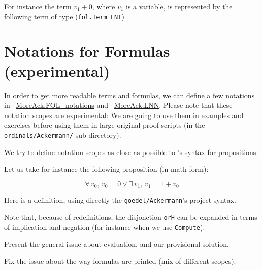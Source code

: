 





For instance the term $v_1+0$, where $v_1$ is a variable,
is represented by the following \gallina term of type 
(\texttt{fol.Term LNT}).








\section{Notations for Formulas (experimental)}

In order to get more readable terms and formulas, we can define a few notations in ~\href{../theories/html/hydras.MoreAck.FOL_notations.html}{MoreAck.FOL\_notations} and
~\href{../theories/html/hydras.MoreAck.LNN.html}{MoreAck.LNN}.
Please note that these notation scopes are experimental: We are going to use them in examples and exercises before using them in large original proof scripts (in the \texttt{ordinals/Ackermann/} sub-directory).

We try to define notation scopes as close as possible to \coq's syntax for propositions.

Let us take for instance the following proposition (in math form):

$$\forall\, v_0,\, v_0=0\vee \exists\,v_1,\,v_1=1+v_0$$

Here is a definition, using directly the \texttt{goedel/Ackermann}'s project syntax.


Note that, because of redefinitions, the disjonction \texttt{orH}
can be expanded in terms of  implication and negation (for instance when we use \texttt{Compute}).

\begin{todo}
  Present the general issue about evaluation, and our provisional solution.
\end{todo}


\begin{todo}
Fix the issue about the way formulas are printed (mix of different scopes).
\end{todo}



